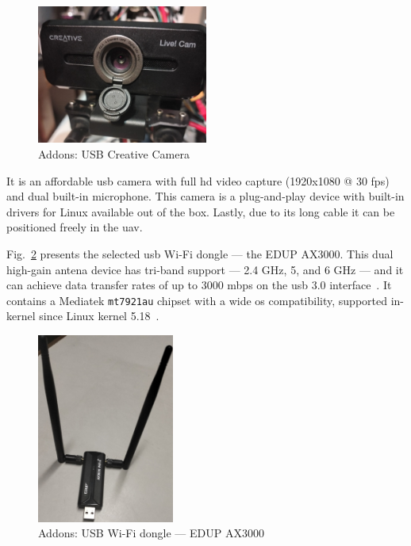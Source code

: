 \begin{figure}[!hbt]
  \centering
  \includegraphics[width=0.5\textwidth]{./img/jpg/creative-cam} 
  \caption{Addons: USB Creative Camera}%
  \label{fig:usb-cam}
\end{figure}

It is an affordable \gls{usb} camera with full
\gls{hd} video capture (1920x1080 @ 30 \gls{fps}) and dual built-in
microphone. This camera is a plug-and-play device with built-in drivers for
Linux available out of the box. Lastly, due to its long cable it can be
positioned freely in the \gls{uav}. 

Fig.~\ref{fig:usb-wifi} presents the selected \gls{usb} Wi-Fi dongle --- the
EDUP AX3000. This dual high-gain antena device has tri-band support --- 2.4 GHz, 5, and 6
GHz --- and it can achieve data transfer rates
of up to 3000 \gls{mbps} on the \gls{usb} 3.0 interface~\cite{ax3000-specs}. It contains a Mediatek
\lstinline{mt7921au} chipset with a wide \gls{os} compatibility, supported
in-kernel since Linux kernel 5.18~\cite{ax3000-linux}.

\begin{figure}[!hbt]
  \centering
  \includegraphics[width=0.4\textwidth]{./img/jpg/ax3000} 
  \caption{Addons: USB Wi-Fi dongle --- EDUP AX3000}%
  \label{fig:usb-wifi}
\end{figure}

